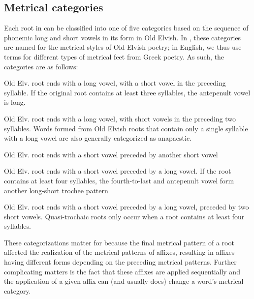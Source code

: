 \subsection{Metrical categories}

Each root in \parentlang{} can be classified into one of five categories based on the sequence of phonemic long and short vowels in its form in Old Elvish. In \parentlang{}, these categories are named for the metrical styles of Old Elvish poetry; in English, we thus use terms for different types of metrical feet from Greek poetry. As such, the categories are as follows:
\begin{description}[rightmargin=30pt, labelindent=30pt, labelwidth=0em, leftmargin=!]
    \item[Iambic:] Old Elv. root ends with a long vowel, with a short vowel in the preceding syllable. If the original root contains at least three syllables, the antepenult vowel is long.
    \item[Anapaestic:] Old Elv. root ends with a long vowel, with short vowels in the preceding two syllables. Words formed from Old Elvish roots that contain only a single syllable with a long vowel are also generally categorized as anapaestic.
    \item[Dactylic:] Old Elv. root ends with a short vowel preceded by another short vowel
    \item[Trochaic:] Old Elv. root ends with a short vowel preceded by a long vowel. If the root contains at least four syllables, the fourth-to-last and antepenult vowel form another long-short trochee pattern
    \item[Quasi-trochaic:] Old Elv. root ends with a short vowel preceded by a long vowel, preceded by two short vowels. Quasi-trochaic roots only occur when a root contains at least four syllables.
\end{description}

These categorizations matter for \parentlang{} because the final metrical pattern of a root affected the realization of the metrical patterns of affixes, resulting in affixes having different forms depending on the preceding metrical patterns. Further complicating matters is the fact that these affixes are applied sequentially and the application of a given affix can (and usually does) change a word's metrical category.

